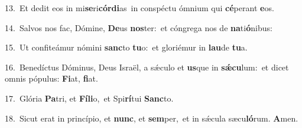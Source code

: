 {\numbfont\textcolor{\numbcolor}{13.}}~Et dedit eos in mi\-\textbf{se}\-ri\-\textbf{cór}\-\textbf{di}as~\star in conspéctu ómnium qui \textbf{cé}\-perant \textbf{e}\-os.\par
{\numbfont\textcolor{\numbcolor}{14.}}~Salvos nos fac, Dómine, \textbf{De}\-us \textbf{nos}\-ter:~\star et cóngrega nos de \textbf{na}\-ti\-\textbf{ó}\-nibus:\par
{\numbfont\textcolor{\numbcolor}{15.}}~Ut confiteámur nómini \textbf{sanc}\-to \textbf{tu}\-o:~\star et gloriémur in \textbf{lau}\-de \textbf{tu}\-a.\par
{\numbfont\textcolor{\numbcolor}{16.}}~Benedíctus Dóminus, Deus Israël, a sǽculo et \textbf{us}\-que in \textbf{sǽ}\-\textbf{cu}lum:~\star et dicet omnis pópulus: \textbf{Fi}\-at, \textbf{fi}\-at.\par
{\numbfont\textcolor{\numbcolor}{17.}}~Glória \textbf{Pa}\-tri, et \textbf{Fí}\-\textbf{li}o,~\star et Spi\-\textbf{rí}\-tui \textbf{Sanc}\-to.\par
{\numbfont\textcolor{\numbcolor}{18.}}~Sicut erat in princípio, et \textbf{nunc}\-, et \textbf{sem}\-per,~\star et in sǽcula sæcu\-\textbf{ló}\-rum. \textbf{A}\-men.\par
